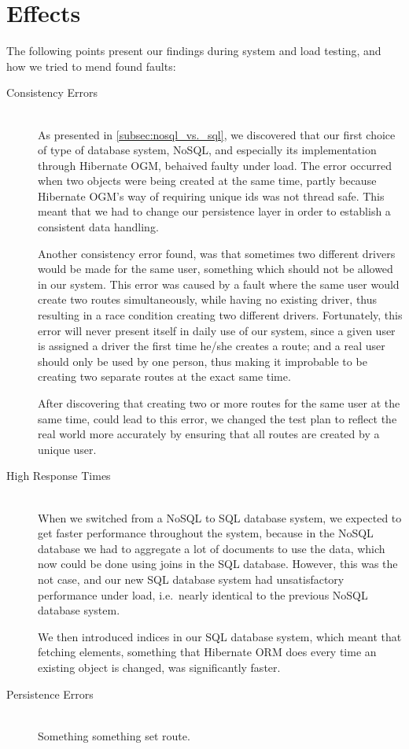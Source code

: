 \section{Effects}
The following points present our findings during system and load testing, and how we tried to mend found faults:
\begin{description}
    \item[Consistency Errors]\hfill \\
        As presented in \cref{subsec:nosql_vs._sql}, we discovered that our first choice of type of database system, NoSQL, and especially its implementation through Hibernate OGM, behaived faulty under load.
        The error occurred when two objects were being created at the same time, partly because Hibernate OGM's way of requiring unique ids was not thread safe.
        This meant that we had to change our persistence layer in order to establish a consistent data handling.

        Another consistency error found, was that sometimes two different drivers would be made for the same user, something which should not be allowed in our system.
        This error was caused by a fault where the same user would create two routes simultaneously, while having no existing driver, thus resulting in a race condition creating two different drivers.
        Fortunately, this error will never present itself in daily use of our system, since a given user is assigned a driver the first time he/she creates a route;
        and a real user should only be used by one person, thus making it improbable to be creating two separate routes at the exact same time.

        After discovering that creating two or more routes for the same user at the same time, could lead to this error, we changed the test plan to reflect the real world more accurately by ensuring that all routes are created by a unique user.
    \item[High Response Times]\hfill \\
        When we switched from a NoSQL to SQL database system, we expected to get faster performance throughout the system, because in the NoSQL database we had to aggregate a lot of documents to use the data, which now could be done using joins in the SQL database.
        However, this was the not case, and our new SQL database system had unsatisfactory performance under load, i.e.~nearly identical to the previous NoSQL database system.

        We then introduced indices in our SQL database system, which meant that fetching elements, something that Hibernate ORM does every time an existing object is changed, was significantly faster.
    \item[Persistence Errors]\hfill \\
        Something something set route.
\end{description}
